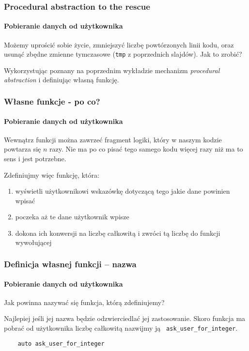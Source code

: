 \documentclass[aspectratio=169]{beamer}
\begin{document}
\begin{frame}
    \frametitle{Procedural abstraction to the rescue}
    \framesubtitle{Pobieranie danych od użytkownika}

    Możemy uprościć sobie życie, zmniejszyć liczbę powtórzonych linii kodu, oraz
    usunąć zbędne zmienne tymczasowe ({\tt tmp} z poprzednich slajdów). Jak to
    zrobić?

    Wykorzystując poznany na poprzednim wykładzie mechanizm \emph{procedural
    abstraction} i definiując własną funkcję.
\end{frame}

\begin{frame}
    \frametitle{Własne funkcje - po co?}
    \framesubtitle{Pobieranie danych od użytkownika}

    Wewnątrz funkcji można zawrzeć fragment logiki, który w naszym kodzie
    powtarza się $n$ razy. Nie ma po co pisać tego samego kodu więcej razy niż
    ma to sens i jest potrzebne.

    Zdefiniujmy więc funkcję, która:
    \begin{enumerate}
        \item wyświetli użytkownikowi wskazówkę dotyczącą tego jakie dane powinien wpisać
        \item poczeka aż te dane użytkownik wpisze
        \item dokona ich konwersji na liczbę całkowitą i zwróci tą liczbę do
            funkcji wywołującej
    \end{enumerate}
\end{frame}

\begin{frame}[fragile]
    \frametitle{Definicja własnej funkcji -- nazwa}
    \framesubtitle{Pobieranie danych od użytkownika}

    Jak powinna nazywać się funkcja, którą zdefiniujemy?

    Najlepiej jeśli jej nazwa będzie odzwierciedlać jej zastosowanie. Skoro
    funkcja ma pobrać od użytkownika liczbę całkowitą nazwijmy ją {\tt
    ask\_user\_for\_integer}.

    \begin{lstlisting}
    auto ask_user_for_integer
    \end{lstlisting}
\end{frame}
\end{document}
